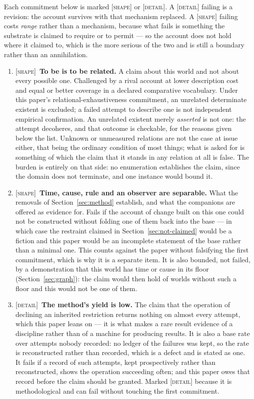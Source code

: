 \documentclass[11pt,a4paper]{article}
\theoremstyle{remark}\newtheorem{remark}[proposition]{Remark}
\begin{document}
Each commitment below is marked \textsc{[shape]} or \textsc{[detail]}. A \textsc{[detail]} failing is
a revision: the account survives with that mechanism replaced. A \textsc{[shape]} failing costs
\emph{range} rather than a mechanism, because what fails is something the substrate is claimed to
require or to permit --- so the account does not hold where it claimed to, which is the more serious
of the two and is still a boundary rather than an annihilation.

\begin{enumerate}[leftmargin=*]
\item \textsc{[shape]}~\textbf{To be is to be related.} A claim about this world and not about every
possible one. Challenged by a rival account at lower description cost and equal or better coverage in a declared comparative vocabulary. Under this paper's relational-exhaustiveness commitment, an unrelated determinate existent is excluded; a failed attempt to describe one is not independent empirical confirmation. An unrelated existent merely \emph{asserted} is not one: the attempt decoheres, and that
outcome is checkable, for the reasons given below the list. Unknown or unmeasured relations are not the
case at issue either, that being the ordinary condition of most things; what is asked for is something
of which the claim that it stands in any relation at all is false. The burden is entirely on that side:
no enumeration establishes the claim, since the domain does not terminate, and one instance would bound
it.

\item \textsc{[shape]}~\textbf{Time, cause, rule and an observer are separable.} What the removals of
Section~\ref{sec:method} establish, and what the companions are offered as evidence for. Fails if the
account of change built on this one could not be constructed without folding one of them back into the
base --- in which case the restraint claimed in Section~\ref{sec:not-claimed} would be a fiction and
this paper would be an incomplete statement of the base rather than a minimal one. This counts against
the paper without falsifying the first commitment, which is why it is a separate item. It is also
bounded, not failed, by a demonstration that this world has time or cause in its floor
(Section~\ref{sec:graph}): the claim would then hold of worlds without such a floor and this would not
be one of them.

\item \textsc{[detail]}~\textbf{The method's yield is low.} The claim that the operation of declining an
inherited restriction returns nothing on almost every attempt, which this paper leans on --- it is what
makes a rare result evidence of a discipline rather than of a machine for producing results. It is also
a base rate over attempts nobody recorded: no ledger of the failures was kept, so the rate is
reconstructed rather than recorded, which is a defect and is stated as one. It fails if a record of such
attempts, kept prospectively rather than reconstructed, shows the operation succeeding often; and this
paper owes that record before the claim should be granted. Marked \textsc{[detail]} because it is
methodological and can fail without touching the first commitment.
\end{enumerate}
\end{document}
